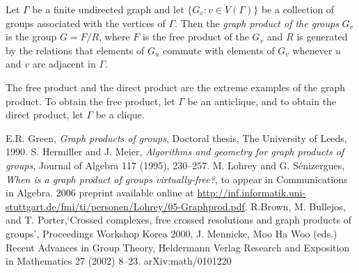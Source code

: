 \documentclass[12pt]{article}
\begin{document}

Let $\Gamma$ be a finite undirected graph and let $\{G_v \colon v\in V(\Gamma)\}$ be a collection of groups associated with the vertices of $\Gamma$.  Then the \emph{graph product of the groups} $G_v$ is the group $G=F/R$, where 
$F$ is the free product of the $G_v$ and $R$ is generated by the relations that elements of $G_u$ commute with elements of $G_v$ whenever $u$ and $v$ are adjacent in $\Gamma$.

The free product and the direct product are the extreme examples of the graph product.  To obtain the free product, let $\Gamma$ be an anticlique, and to obtain the direct product, let $\Gamma$ be a clique.

\begin{thebibliography}{9}
E.R. Green, \emph{Graph products of groups}, Doctoral thesis, The University of Leeds, 1990.
S. Hermiller and J. Meier, \emph{Algorithms and geometry for graph products of groups}, Journal of Algebra 117 (1995), 230--257.
M. Lohrey and G. S\'{e}nizergues, \emph{When is a graph product of groups virtually-free?}, to appear in Communications in Algebra.  2006 preprint available online at \url{http://inf.informatik.uni-stuttgart.de/fmi/ti/personen/Lohrey/05-Graphprod.pdf}.
 R.Brown, M. Bullejos, and T. Porter,`Crossed complexes, free
crossed resolutions and graph products of groups', Proceedings
Workshop Korea 2000,  J. Mennicke, Moo Ha Woo (eds.) Recent
Advances in Group Theory, Heldermann Verlag  Research and
Exposition in Mathematics  27 (2002) 8--23. arXiv:math/0101220


\end{thebibliography}
\end{document}
